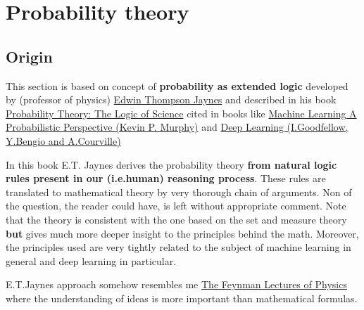 \documentclass[12pt]{article}
\begin{document}
\newlength{\notationgap}
\setlength{\notationgap}{1pc}

\section{Probability theory}

\subsection{Origin}
This section is based on concept of {\bf probability as extended logic} developed by (professor of physics)
\href{https://en.wikipedia.org/wiki/Edwin_Thompson_Jaynes}{Edwin Thompson Jaynes} and described in his book
\href{https://www.amazon.com/Probability-Theory-Science-T-Jaynes/dp/0521592712}{Probability Theory: The Logic of Science}
cited in books like
\href{https://mitpress.mit.edu/books/machine-learning-1}{Machine Learning A Probabilistic Perspective (Kevin P. Murphy)} and 
\href{https://mitpress.mit.edu/books/deep-learning}{Deep Learning (I.Goodfellow, Y.Bengio and A.Courville)}

In this book E.T. Jaynes derives the probability theory {\bf from natural logic rules present in our (i.e.human) reasoning process}. 
These rules are translated to mathematical theory by very
thorough chain of arguments. Non of the question, the reader could have, is left without appropriate comment. 
Note that the theory is consistent with the one based on the set and measure theory {\bf but} gives much more deeper insight 
to the principles behind the math. Moreover, the principles used are very tightly related to the subject of 
machine learning in general and deep learning in particular.

E.T.Jaynes approach somehow resembles me \href{https://www.feynmanlectures.caltech.edu/}{The Feynman Lectures of Physics} where 
the understanding of ideas is more important than mathematical formulas.  
\end{document}
